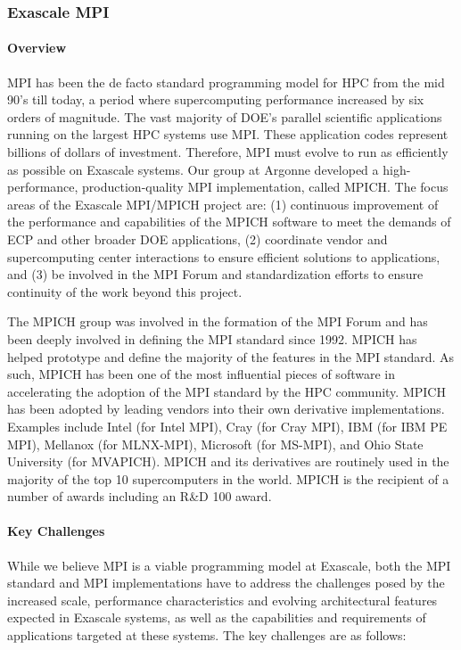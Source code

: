 \subsubsection{ Exascale MPI} \label{subsubsect:mpich}
\paragraph{Overview}

MPI has been the de facto standard programming model for HPC from the
mid 90's till today, a period where supercomputing performance
increased by six orders of magnitude.  The vast majority of DOE's
parallel scientific applications running on the largest HPC systems
use MPI. These application codes represent billions of dollars of
investment. Therefore, MPI must evolve to run as efficiently as
possible on Exascale systems. Our group at Argonne developed a
high-performance, production-quality MPI implementation, called MPICH.
The focus areas of the Exascale MPI/MPICH project are: (1)
continuous improvement of the performance and capabilities of the
MPICH software to meet the demands of ECP and other broader DOE
applications, (2) coordinate vendor and supercomputing center
interactions to ensure efficient solutions to applications, and (3) be
involved in the MPI Forum and standardization efforts to ensure
continuity of the work beyond this project.

The MPICH group was involved in the formation of the MPI Forum and has been
deeply involved in defining the MPI standard since 1992. MPICH has
helped prototype and define the majority of the features in the MPI
standard. As such, MPICH has been one of the most influential pieces of
software in accelerating the adoption of the MPI standard by the HPC
community. MPICH has been adopted by leading vendors into their own
derivative implementations. Examples include Intel (for Intel MPI), Cray
(for Cray MPI), IBM (for IBM PE MPI), Mellanox (for MLNX-MPI), Microsoft
(for MS-MPI), and Ohio State University (for MVAPICH). MPICH and its
derivatives are routinely used in the majority of the top 10 supercomputers in
the world. MPICH is the recipient of a number of awards including
an R\&D 100 award.

\paragraph{Key Challenges}

While we believe MPI is a viable programming model at Exascale, both
the MPI standard and MPI implementations have to address the
challenges posed by the increased scale, performance characteristics
and evolving architectural features expected in Exascale systems, as
well as the capabilities and requirements of applications targeted at
these systems. The key challenges are as follows:

